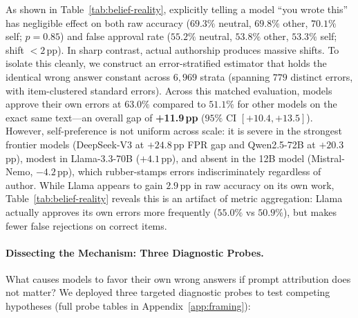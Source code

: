 As shown in Table~\ref{tab:belief-reality}, explicitly telling a model ``you wrote this'' has negligible effect on both raw accuracy ($69.3\%$ neutral, $69.8\%$ other, $70.1\%$ self; $p = 0.85$) and false approval rate ($55.2\%$ neutral, $53.8\%$ other, $53.3\%$ self; shift $< 2$\,pp). In sharp contrast, actual authorship produces massive shifts. To isolate this cleanly, we construct an error-stratified estimator that holds the identical wrong answer constant across $6{,}969$ strata (spanning $779$ distinct errors, with item-clustered standard errors). Across this matched evaluation, models approve their own errors at $63.0\%$ compared to $51.1\%$ for other models on the exact same text---an overall gap of \textbf{+11.9\,pp} ($95\%$ CI $[+10.4, +13.5]$). However, self-preference is not uniform across scale: it is severe in the strongest frontier models (DeepSeek-V3 at $+24.8$\,pp FPR gap and Qwen2.5-72B at $+20.3$\,pp), modest in Llama-3.3-70B ($+4.1$\,pp), and absent in the 12B model (Mistral-Nemo, $-4.2$\,pp), which rubber-stamps errors indiscriminately regardless of author. While Llama appears to gain $2.9$\,pp in raw accuracy on its own work, Table~\ref{tab:belief-reality} reveals this is an artifact of metric aggregation: Llama actually approves its own errors more frequently ($55.0\%$ vs $50.9\%$), but makes fewer false rejections on correct items.

\paragraph{Dissecting the Mechanism: Three Diagnostic Probes.}
What causes models to favor their own wrong answers if prompt attribution does not matter? We deployed three targeted diagnostic probes to test competing hypotheses (full probe tables in Appendix~\ref{app:framing}):

